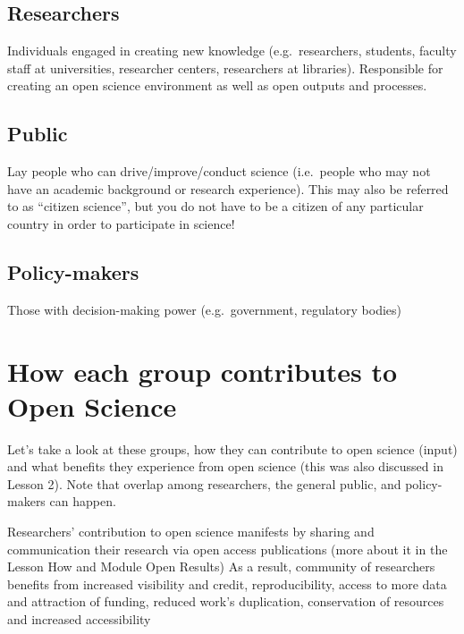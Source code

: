 \documentclass[
  letterpaper,
  DIV=11,
  numbers=noendperiod]{scrreport}
\begin{document}
\hypertarget{researchers}{%
\subsection{Researchers}\label{researchers}}

Individuals engaged in creating new knowledge (e.g.~researchers,
students, faculty staff at universities, researcher centers, researchers
at libraries). Responsible for creating an open science environment as
well as open outputs and processes.

\hypertarget{public}{%
\subsection{Public}\label{public}}

Lay people who can drive/improve/conduct science (i.e.~people who may
not have an academic background or research experience). This may also
be referred to as ``citizen science'', but you do not have to be a
citizen of any particular country in order to participate in science!

\hypertarget{policy-makers}{%
\subsection{Policy-makers}\label{policy-makers}}

Those with decision-making power (e.g.~government, regulatory bodies)

\hypertarget{how-each-group-contributes-to-open-science}{%
\section{How each group contributes to Open
Science}\label{how-each-group-contributes-to-open-science}}

Let's take a look at these groups, how they can contribute to open
science (input) and what benefits they experience from open science
(this was also discussed in Lesson 2). Note that overlap among
researchers, the general public, and policy-makers can happen.

Researchers' contribution to open science manifests by sharing and
communication their research via open access publications (more about it
in the Lesson How and Module Open Results) As a result, community of
researchers benefits from increased visibility and credit,
reproducibility, access to more data and attraction of funding, reduced
work's duplication, conservation of resources and increased
accessibility
\end{document}
